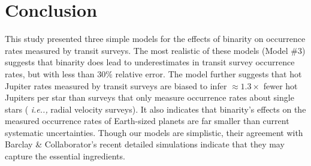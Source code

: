 \section{Conclusion}
\label{sec:conclusion}

This study presented three simple models for the effects of binarity on 
occurrence rates measured by transit surveys.
The most realistic of these models (Model \#3) suggests that binarity does 
lead to underestimates in transit survey occurrence rates, but with less than 
$30\%$ relative error.
The model further suggests that hot Jupiter rates measured by transit surveys 
are biased to infer $\approx 1.3\times$ fewer hot Jupiters per star than 
surveys that only measure occurrence rates about single stars ({\it 
i.e..,} radial velocity surveys).
It also indicates that binarity's effects on the measured 
occurrence rates of Earth-sized planets are far smaller than current 
systematic uncertainties.
Though our models are simplistic, their agreement with Barclay \& 
Collaborator's recent detailed simulations indicate that they may capture the 
essential ingredients.
